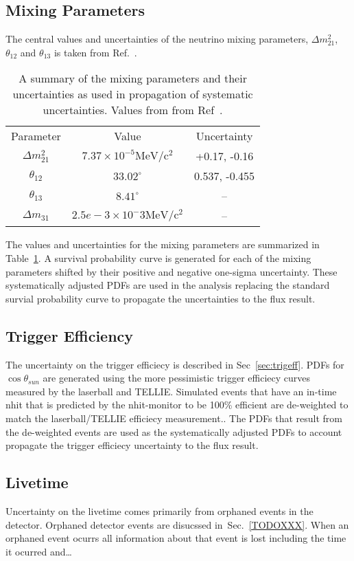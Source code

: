 \subsection{Mixing Parameters}
The central values and uncertainties of the neutrino mixing parameters, $\Delta
m^{2}_{21}$, $\theta_{12}$ and $\theta_{13}$ is taken from Ref.~\cite{pdg_globalfit}.
\begin{table}
    \centering
    \begin{tabular}{c c c}
        Parameter & Value & Uncertainty\\
        $\Delta m^{2}_{21}$ & $7.37\times10^{-5} \mathrm{MeV}/\mathrm{c}^{2}$ & +0.17, -0.16\\
        $\theta_{12}$ & $33.02^{\circ}$ & 0.537, -0.455 \\
        $\theta_{13}$ & $8.41^{\circ}$ & -- \\
        $\Delta m_{31}$ & $2.5e-3\times10^-3\mathrm{MeV}/\mathrm{c}^{2}$ & -- \\
    \end{tabular}
    \caption{A summary of the mixing parameters and their uncertainties as used in 
    propagation of systematic uncertainties. Values from from Ref~\cite{pdg_globalfit}.}
\label{tbl:mixing_values}
\end{table}
The values and uncertainties for the mixing parameters
are summarized in Table~\ref{tbl:mixing_values}.
A survival probability curve is generated for each of the mixing parameters
shifted by their positive and negative one-sigma uncertainty.
These systematically adjusted PDFs are used in the analysis replacing the
standard survial probability curve to propagate the uncertainties to the
flux result.
\subsection{Trigger Efficiency}
The uncertainty on the trigger efficiecy is described in Sec~\ref{sec:trigeff}.
PDFs for $\cos\theta_{sun}$ are generated using the more pessimistic
trigger efficiecy curves measured by the laserball and TELLIE\@.
Simulated events that have an in-time nhit that is predicted by the nhit-monitor
to be 100\% efficient are de-weighted to match the laserball/TELLIE efficiecy
measurement..
The PDFs that result from the de-weighted events are used as the systematically
adjusted PDFs to account propagate the trigger efficiecy uncertainty to the
flux result.
\subsection{Livetime}
Uncertainty on the livetime comes primarily from orphaned events in the detector.
Orphaned detector events are disucssed in~Sec.~\ref{TODOXXX}.
When an orphaned event ocurrs all information about that event is lost including
the time it ocurred and\ldots%

